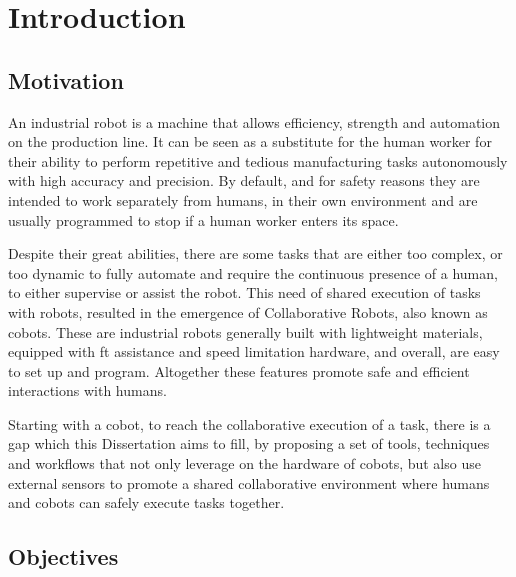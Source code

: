 \chapter{Introduction}



\section{Motivation}

\par An industrial robot is a machine that allows efficiency, strength and automation on the production line. It can be seen as a substitute for the human worker for their ability to perform repetitive and tedious manufacturing tasks autonomously with high accuracy and precision. By default, and for safety reasons they are intended to work separately from humans, in their own environment and are usually programmed to stop if a human worker enters its space.

\par Despite their great abilities, there are some tasks that are either too complex, or too dynamic to fully automate and require the continuous presence of a human, to either supervise or assist the robot. This need of shared execution of tasks with robots, resulted in the emergence of Collaborative Robots, also known as \acsp{cobot}. These are industrial robots generally built with lightweight materials, equipped with \ac{ft} assistance and speed limitation hardware, and overall, are easy to set up and program. Altogether these features promote safe and efficient interactions with humans.

\par Starting with a cobot, to reach the collaborative execution of a task, there is a gap which this Dissertation aims to fill, by proposing a set of tools, techniques and workflows that not only leverage on the hardware of cobots, but also use external sensors to promote a shared collaborative environment where humans and cobots can safely execute tasks together.


\section{Objectives}

